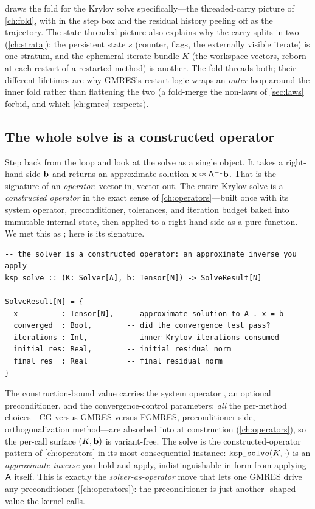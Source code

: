  draws the fold for the Krylov solve specifically---the
threaded-carry picture of \cref{ch:fold}, with  in the step box
and the residual history peeling off as the trajectory. The state-threaded picture
also explains why the carry splits in two (\cref{ch:strata}): the persistent
state $s$ (counter, flags, the externally visible iterate) is one stratum, and the
ephemeral iterate bundle $K$ (the workspace vectors, reborn at each restart of a
restarted method) is another. The fold threads both; their different lifetimes are
why GMRES's restart logic wraps an \emph{outer} loop around the inner fold rather
than flattening the two (a fold-merge the non-laws of \cref{sec:laws} forbid, and
which \cref{ch:gmres} respects).

\subsection{The whole solve is a constructed operator}
\label{sec:krylov-operator}

Step back from the loop and look at the solve as a single object. It takes a
right-hand side $\mathbf{b}$ and returns an approximate solution $\mathbf{x}\approx\mathsf{A}^{-1}\mathbf{b}$.
That is the signature of an \emph{operator}: vector in, vector out. The entire
Krylov solve is a \emph{constructed operator} in the exact sense of
\cref{ch:operators}---built once with its system operator, preconditioner,
tolerances, and iteration budget baked into immutable internal state, then applied to
a right-hand side as a pure function. We met this as ; here is its
signature.

\begin{lstlisting}[style=l4style]
-- the solver is a constructed operator: an approximate inverse you apply
ksp_solve :: (K: Solver[A], b: Tensor[N]) -> SolveResult[N]

SolveResult[N] = {
  x          : Tensor[N],   -- approximate solution to A . x = b
  converged  : Bool,        -- did the convergence test pass?
  iterations : Int,         -- inner Krylov iterations consumed
  initial_res: Real,        -- initial residual norm
  final_res  : Real         -- final residual norm
}
\end{lstlisting}

The construction-bound value  carries the system operator , an
optional preconditioner, and the convergence-control parameters; \emph{all} the
per-method choices---CG versus GMRES versus FGMRES, preconditioner side,
orthogonalization method---are absorbed into  at construction
(\cref{ch:operators}), so the per-call surface $(K,\mathbf{b})$ is variant-free. The solve
is the constructed-operator pattern of \cref{ch:operators} in its most consequential
instance: $\texttt{ksp\_solve}(K,\cdot)$ is an \emph{approximate inverse} you hold and
apply, indistinguishable in form from applying $\mathsf{A}$ itself. This is exactly the
\emph{solver-as-operator} move that lets one GMRES drive any preconditioner
(\cref{ch:operators}): the preconditioner is just another -shaped value
the kernel calls.

